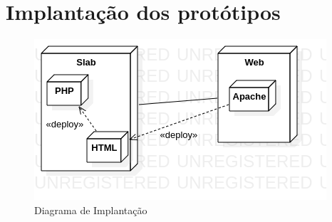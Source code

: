 \chapter{Implantação dos protótipos}
\begin{figure}[H]
  \centering
  \includegraphics[width=0.8\linewidth]{imagens/implantação.png} 
  \caption{Diagrama de Implantação}
  \label{fig:exemplo}
\end{figure}